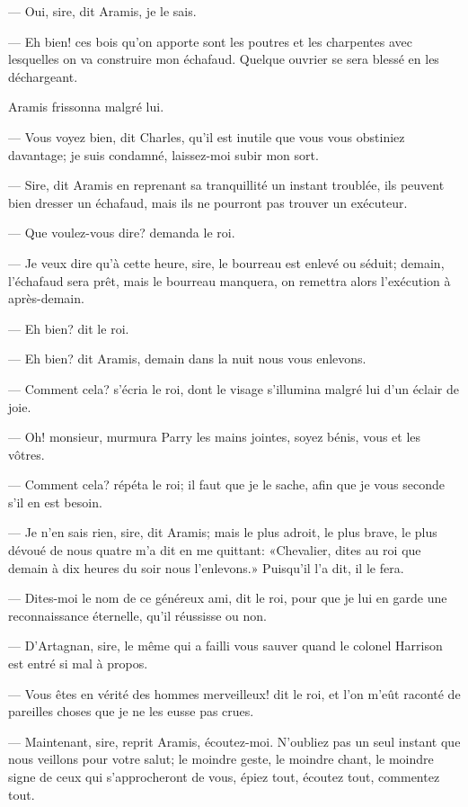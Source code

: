— Oui, sire, dit Aramis, je le sais.

— Eh bien! ces bois qu'on apporte sont les poutres et les charpentes avec lesquelles on va construire mon échafaud. Quelque ouvrier se sera blessé en les déchargeant.

Aramis frissonna malgré lui.

— Vous voyez bien, dit Charles, qu'il est inutile que vous vous obstiniez davantage; je suis condamné, laissez-moi subir mon sort.

— Sire, dit Aramis en reprenant sa tranquillité un instant troublée, ils peuvent bien dresser un échafaud, mais ils ne pourront pas trouver un exécuteur.

— Que voulez-vous dire? demanda le roi.

— Je veux dire qu'à cette heure, sire, le bourreau est enlevé ou séduit; demain, l'échafaud sera prêt, mais le bourreau manquera, on remettra alors l'exécution à après-demain.

— Eh bien? dit le roi.

— Eh bien? dit Aramis, demain dans la nuit nous vous enlevons.

— Comment cela? s'écria le roi, dont le visage s'illumina malgré lui d'un éclair de joie.

— Oh! monsieur, murmura Parry les mains jointes, soyez bénis, vous et les vôtres.

— Comment cela? répéta le roi; il faut que je le sache, afin que je vous seconde s'il en est besoin.

— Je n'en sais rien, sire, dit Aramis; mais le plus adroit, le plus brave, le plus dévoué de nous quatre m'a dit en me quittant: «Chevalier, dites au roi que demain à dix heures du soir nous l'enlevons.» Puisqu'il l'a dit, il le fera.

— Dites-moi le nom de ce généreux ami, dit le roi, pour que je lui en garde une reconnaissance éternelle, qu'il réussisse ou non.

— D'Artagnan, sire, le même qui a failli vous sauver quand le colonel Harrison est entré si mal à propos.

— Vous êtes en vérité des hommes merveilleux! dit le roi, et l'on m'eût raconté de pareilles choses que je ne les eusse pas crues.

— Maintenant, sire, reprit Aramis, écoutez-moi. N'oubliez pas un seul instant que nous veillons pour votre salut; le moindre geste, le moindre chant, le moindre signe de ceux qui s'approcheront de vous, épiez tout, écoutez tout, commentez tout.

